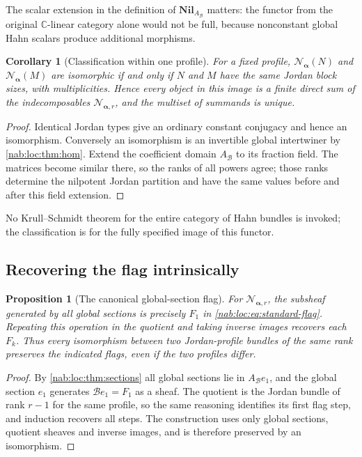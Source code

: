 \documentclass[11pt,letterpaper]{article}
\newtheorem{proposition}[proposition]{Proposition}
\newtheorem{corollary}[corollary]{Corollary}
\theoremstyle{definition}
\theoremstyle{remark}
\newcommand{\C}{\mathbb C}
\newcommand{\BB}{\mathscr B}
\newcommand{\Aglob}{A_{\BB}}
\newcommand{\Nil}{\mathbf{Nil}}
\newcommand{\profile}{\boldsymbol\alpha}
\newcommand{\NN}[1]{\mathcal N_{\profile,#1}}
\numberwithin{equation}{section}
\begin{document}
The scalar extension in the definition of $\Nil_{\Aglob}$ matters: the functor
from the original $\C$-linear category alone would not be full, because
nonconstant global Hahn scalars produce additional morphisms.

\begin{corollary}[Classification within one profile]\label{nab:loc:cor:jordan-class}
For a fixed profile, $\mathcal N_{\profile}(N)$ and $\mathcal N_{\profile}(M)$
are isomorphic if and only if $N$ and $M$ have the same Jordan block sizes, with
multiplicities. Hence every object in this image is a finite direct sum of the
indecomposables $\NN r$, and the multiset of summands is unique.
\end{corollary}

\begin{proof}
Identical Jordan types give an ordinary constant conjugacy and hence an
isomorphism. Conversely an isomorphism is an invertible global intertwiner by
\cref{nab:loc:thm:hom}. Extend the coefficient domain $\Aglob$ to its fraction
field. The matrices become similar there, so the ranks of all powers agree;
those ranks determine the nilpotent Jordan partition and have the same values
before and after this field extension.
\end{proof}

No Krull--Schmidt theorem for the entire category of Hahn bundles is invoked;
the classification is for the fully specified image of this functor.

\subsection{Recovering the flag intrinsically}

\begin{proposition}[The canonical global-section flag]\label{nab:loc:prop:flag}
For $\NN r$, the subsheaf generated by all global sections is precisely $F_1$
in \eqref{nab:loc:eq:standard-flag}. Repeating this operation in the quotient
and taking inverse images recovers each $F_k$. Thus every isomorphism between
two Jordan-profile bundles of the same rank preserves the indicated flags, even
if the two profiles differ.
\end{proposition}

\begin{proof}
By \cref{nab:loc:thm:sections} all global sections lie in $\Aglob e_1$, and the
global section $e_1$ generates $\BB e_1=F_1$ as a sheaf. The quotient is the
Jordan bundle of rank $r-1$ for the same profile, so the same reasoning
identifies its first flag step, and induction recovers all steps. The
construction uses only global sections, quotient sheaves and inverse images,
and is therefore preserved by an isomorphism.
\end{proof}
\end{document}
